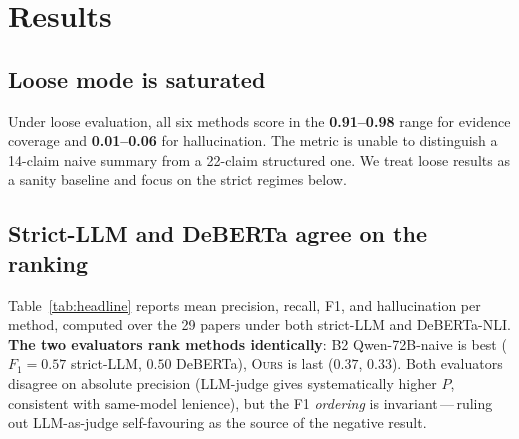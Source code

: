 \documentclass[11pt,a4paper]{article}
\begin{document}
\section{Results}
\label{sec:results}

\subsection{Loose mode is saturated}

Under loose evaluation, all six methods score in the
\textbf{0.91--0.98} range for evidence coverage and \textbf{0.01--0.06}
for hallucination. The metric is unable to distinguish a 14-claim naive
summary from a 22-claim structured one. We treat loose results as a
sanity baseline and focus on the strict regimes below.

\subsection{Strict-LLM and DeBERTa agree on the ranking}

Table~\ref{tab:headline} reports mean precision, recall, F1, and
hallucination per method, computed over the 29 papers under both
strict-LLM and DeBERTa-NLI. \textbf{The two evaluators rank methods
identically}: B2 Qwen-72B-naive is best ($F_1\!=\!0.57$ strict-LLM,
$0.50$ DeBERTa), \textsc{Ours} is last ($0.37$, $0.33$). Both evaluators
disagree on absolute precision (LLM-judge gives systematically higher
$P$, consistent with same-model lenience), but the F1 \emph{ordering}
is invariant\,---\,ruling out LLM-as-judge self-favouring as the source
of the negative result.
\end{document}
